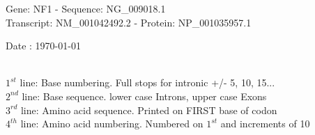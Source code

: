 \documentclass{article}
\begin{document}
\renewcommand{\footrulewidth}{1pt}
\renewcommand{\headrulewidth}{0pt}
\begin{center}
\begin{large}
Gene: NF1 - Sequence: NG\_009018.1\\
Transcript: NM\_001042492.2 - Protein: NP\_001035957.1
 
 Date : \today\\\\
\end{large}
\end{center}
$1^{st}$ line: Base numbering. Full stops for intronic +/- 5, 10, 15...\\
$2^{nd}$ line: Base sequence. lower case Introns, upper case Exons\\
$3^{rd}$ line: Amino acid sequence. Printed on FIRST base of codon\\
$4^{th}$ line: Amino acid numbering. Numbered on $1^{st}$ and increments of 10\\
\end{document}
